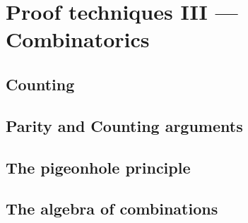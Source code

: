 
\chapter{Proof techniques III --- Combinatorics}

\section{Counting}



\clearpage

\section{Parity and Counting arguments}




\clearpage


\section{The pigeonhole principle}




\clearpage

\section{The algebra of combinations}






